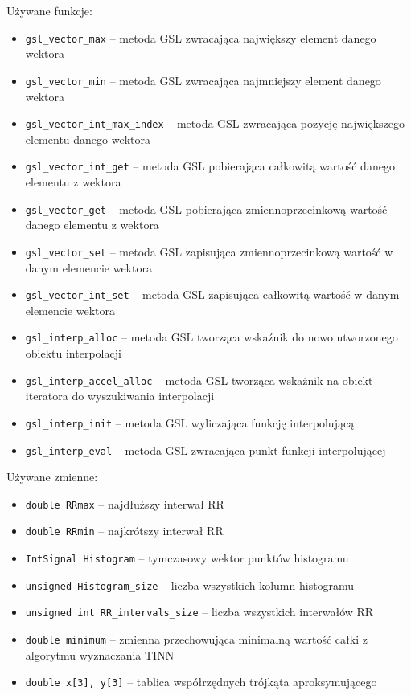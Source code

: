 \documentclass[a4paper, 11pt]{article}
\begin{document}
Używane funkcje:
\begin{itemize}
\item \verb+gsl_vector_max+ -- metoda GSL zwracająca największy element danego
wektora
\item \verb+gsl_vector_min+ -- metoda GSL zwracająca najmniejszy element danego
wektora
\item \verb+gsl_vector_int_max_index+ -- metoda GSL zwracająca pozycję największego
elementu danego wektora
\item \verb+gsl_vector_int_get+ -- metoda GSL pobierająca całkowitą wartość danego
elementu z wektora
\item \verb+gsl_vector_get+ -- metoda GSL pobierająca zmiennoprzecinkową wartość
danego elementu z wektora
\item \verb+gsl_vector_set+ -- metoda GSL zapisująca zmiennoprzecinkową wartość
w danym elemencie wektora
\item \verb+gsl_vector_int_set+ -- metoda GSL zapisująca całkowitą wartość w
danym elemencie wektora
\item \verb+gsl_interp_alloc+ -- metoda GSL tworząca wskaźnik do nowo utworzonego
obiektu interpolacji
\item \verb+gsl_interp_accel_alloc+ -- metoda GSL tworząca wskaźnik na obiekt
iteratora do wyszukiwania interpolacji 
\item \verb+gsl_interp_init+ -- metoda GSL wyliczająca funkcję interpolującą
\item \verb+gsl_interp_eval+ -- metoda GSL zwracająca punkt funkcji interpolującej 
\end{itemize}
\medskip{}


Używane zmienne:
\begin{itemize}
\item \verb+double RRmax+ -- najdłuższy interwał RR
\item \verb+double RRmin+ -- najkrótszy interwał RR
\item \verb+IntSignal Histogram+ -- tymczasowy wektor punktów histogramu
\item \verb+unsigned Histogram_size+ -- liczba wszystkich kolumn histogramu
\item \verb+unsigned int RR_intervals_size+ -- liczba wszystkich interwałów RR
\item \verb+double minimum+ -- zmienna przechowująca minimalną wartość całki z algorytmu
wyznaczania TINN
\item \verb+double x[3], y[3]+ -- tablica współrzędnych trójkąta aproksymującego
\end{itemize}
\end{document}
